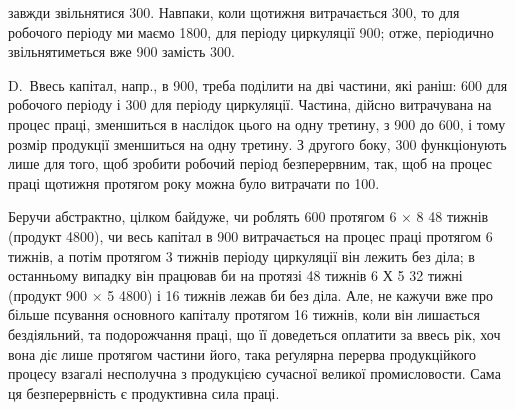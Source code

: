 \parcont{}  %
завжди звільнятися 300. Навпаки, коли щотижня витрачається
300, то для робочого періоду ми маємо 1800, для періоду
циркуляції 900; отже, періодично звільнятиметься вже 900
замість 300.

D.~Ввесь капітал, напр., в 900, треба поділити на дві частини,
які раніш: 600 для робочого періоду і 300 для періоду
циркуляції. Частина, дійсно витрачувана на процес праці, зменшиться в
наслідок цього на одну третину, з 900 до 600, і тому розмір продукції
зменшиться на одну третину. З другого боку, 300
функціонують лише для того, щоб зробити робочий період безперервним,
так, щоб на процес праці щотижня протягом року можна було витрачати
по 100.

Беручи абстрактно, цілком байдуже, чи роблять 600 протягом
6 × 8 \deq{} 48 тижнів (продукт \deq{} 4800), чи весь капітал в 900
витрачається на процес праці протягом 6 тижнів, а потім протягом
3 тижнів періоду циркуляції він лежить без діла; в останньому випадку
він працював би на протязі 48 тижнів 6 Х 5  \deq{} 32 тижні (продукт \deq{}
900 × 5 \deq{} 4800) і 16 тижнів лежав би без діла. Але, не кажучи
вже про більше псування основного капіталу протягом 16 тижнів, коли
він лишається бездіяльний, та подорожчання праці, що її доведеться оплатити
за ввесь рік, хоч вона діє лише протягом частини його, така реґулярна
перерва продукційкого процесу взагалі несполучна з продукцією
сучасної великої промисловости. Сама ця безперервність є продуктивна
сила праці.


